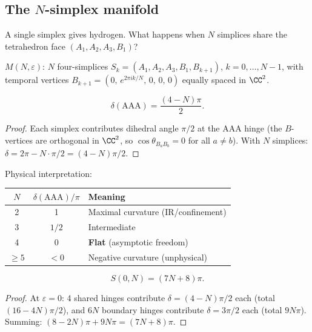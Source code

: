 \subsection{The $N$-simplex manifold}
\label{sec:n_simplex}

A single simplex gives hydrogen.  What happens when $N$ simplices share the tetrahedron face $(A_1, A_2, A_3, B_1)$?

\begin{definition}
$M(N,\varepsilon)$: $N$ four-simplices $S_k = (A_1, A_2, A_3, B_1, B_{k+1})$, $k = 0,\ldots,N\!-\!1$, with temporal vertices $B_{k+1} = (0,\, e^{2\pi i k/N},\, 0,\, 0,\, 0)$ equally spaced in $\CC^2$.
\end{definition}

\begin{theorem}
\label{thm:deficit_N}
\begin{equation}
\boxed{\delta(\mathrm{AAA}) = \frac{(4-N)\pi}{2}.}
\end{equation}
\end{theorem}
\begin{proof}
Each simplex contributes dihedral angle $\pi/2$ at the AAA hinge (the $B$-vertices are orthogonal in $\CC^2$, so $\cos\theta_{B_a B_b} = 0$ for all $a \neq b$).  With $N$ simplices: $\delta = 2\pi - N\cdot\pi/2 = (4-N)\pi/2$.
\end{proof}

Physical interpretation:
\begin{center}
\begin{tabular}{ccl}
\hline
$N$ & $\delta(\mathrm{AAA})/\pi$ & Meaning \\
\hline
2 & 1 & Maximal curvature (IR/confinement) \\
3 & $1/2$ & Intermediate \\
4 & $0$ & \textbf{Flat} (asymptotic freedom) \\
$\geq 5$ & $<0$ & Negative curvature (unphysical) \\
\hline
\end{tabular}
\end{center}

\begin{theorem}
\label{thm:action_zero}
\begin{equation}
S(0, N) = (7N + 8)\pi.
\end{equation}
\end{theorem}
\begin{proof}
At $\varepsilon = 0$: 4 shared hinges contribute $\delta = (4\!-\!N)\pi/2$ each (total $(16\!-\!4N)\pi/2$), and $6N$ boundary hinges contribute $\delta = 3\pi/2$ each (total $9N\pi$).  Summing: $(8\!-\!2N)\pi + 9N\pi = (7N\!+\!8)\pi$.
\end{proof}

